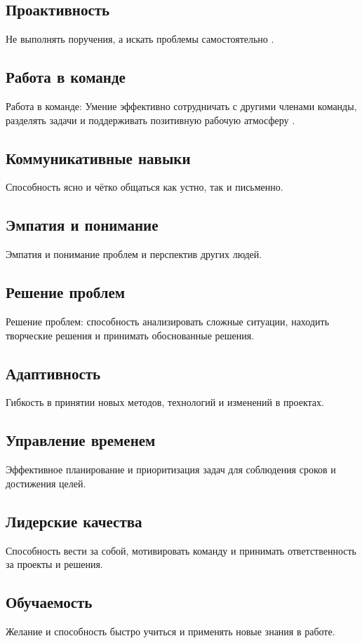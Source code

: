 \documentclass[variant=practice]{bsuir}
\begin{document}
\subsection{Проактивность} Не выполнять поручения, а искать проблемы
самостоятельно \cite{devops-mts}.

\subsection{Работа в команде} Работа в команде: Умение эффективно сотрудничать с
другими членами команды, разделять задачи и поддерживать позитивную рабочую
атмосферу \cite{devops-mts}.

\subsection{Коммуникативные навыки} Способность ясно и чётко общаться как устно,
так и письменно.

\subsection{Эмпатия и понимание} Эмпатия и понимание проблем и перспектив других
людей.

\subsection{Решение проблем} Решение проблем: способность анализировать сложные
ситуации, находить творческие решения и принимать обоснованные решения.

\subsection{Адаптивность} Гибкость в принятии новых методов, технологий и
изменений в проектах.

\subsection{Управление временем} Эффективное планирование и приоритизация задач
для соблюдения сроков и достижения целей.

\subsection{Лидерские качества} Способность вести за собой, мотивировать команду
и принимать ответственность за проекты и решения.

\subsection{Обучаемость} Желание и способность быстро учиться и применять новые
знания в работе.
\end{document}
